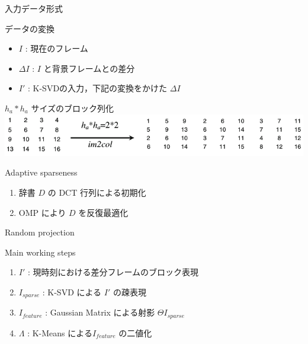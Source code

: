 \begin{frame}{入力データ形式}
\begin{block}{データの変換}
\begin{itemize}
 \item $I$ : 現在のフレーム
 \item $\Delta I$ : $I$ と背景フレームとの差分
 \item $I'$ : K-SVDの入力，下記の変換をかけた $\Delta I$
\end{itemize}
\end{block}
$h_a * h_a$ サイズのブロック列化
\includegraphics[scale=0.5]{figure/im2col.png}
\end{frame}


\begin{frame}{Adaptive sparseness}
\begin{enumerate}
    \item 辞書 $D$ の DCT 行列による初期化
    \item OMP により $D$ を反復最適化
\end{enumerate}
\end{frame}



\begin{frame}{Random projection}
 
\end{frame}


\begin{frame}{Main working steps}
\begin{enumerate}
    \item $I'$ : 現時刻における差分フレームのブロック表現
    \item $I_{sparse}$ : K-SVD による $I'$ の疎表現
    \item $I_{feature}$ : Gaussian Matrix による射影 $\Theta I_{sparse}$
    \item $\Lambda$ : K-Means による$I_{feature}$ の二値化
\end{enumerate}
\end{frame}

